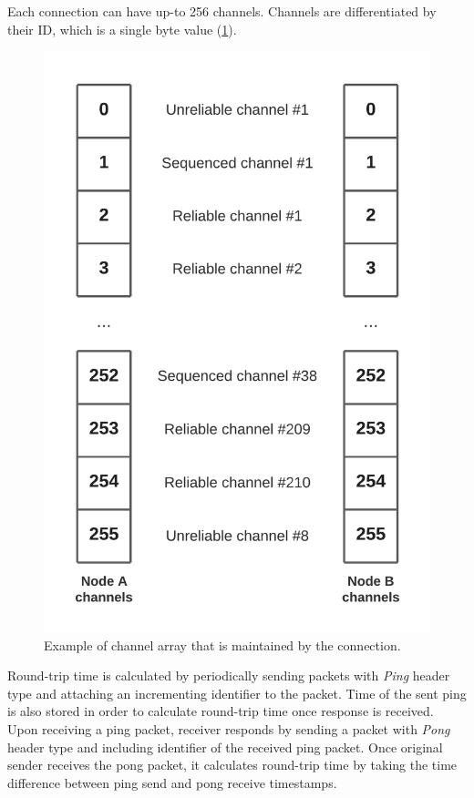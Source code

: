 \documentclass[times, utf8, diplomski]{fer}
\begin{document}
Each connection can have up-to 256 channels. Channels are differentiated by their ID, which is a single byte value (\ref{fig:connection-channels}).

\begin{figure}[H]
	\centering
	\includegraphics[scale=0.25]{Connection-channels}
	\caption{Example of channel array that is maintained by the connection.}
	\label{fig:connection-channels}
\end{figure}

Round-trip time is calculated by periodically sending packets with \textit{Ping} header type and attaching an incrementing identifier to the packet. Time of the sent ping is also stored in order to calculate round-trip time once response is received. Upon receiving a ping packet, receiver responds by sending a packet with \textit{Pong} header type and including identifier of the received ping packet. Once original sender receives the pong packet, it calculates round-trip time by taking the time difference between ping send and pong receive timestamps.
\end{document}
